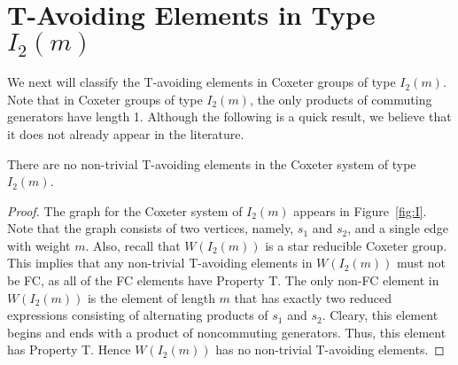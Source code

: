 
\section{T-Avoiding Elements in Type $I_2(m)$}

We next will classify the T-avoiding elements in Coxeter groups of type $I_2(m)$. Note that in Coxeter groups of type $I_2(m)$, the only products of commuting generators have length 1. Although the following is a quick result, we believe that it does not already appear in the literature.
\begin{theorem}
There are no non-trivial T-avoiding elements in the Coxeter system of type $I_2(m)$.
\begin{proof}
	The graph for the Coxeter system of $I_2(m)$ appears in Figure~\ref{fig:I}. Note that the graph consists of two vertices, namely, $s_1$ and $s_2$, and a single edge with weight $m$. Also, recall that $W(I_2(m))$ is a star reducible Coxeter group. This implies that any non-trivial T-avoiding elements in $W(I_2(m))$ must not be FC, as all of the FC elements have Property T. The only non-FC element in $W(I_2(m))$ is the element of length $m$ that has exactly two reduced expressions consisting of alternating products of $s_1$ and $s_2$. Cleary, this element begins and ends with a product of noncommuting generators. Thus, this element has Property T. Hence $W(I_2(m))$ has no non-trivial T-avoiding elements. 
\end{proof}	
\end{theorem}
 



